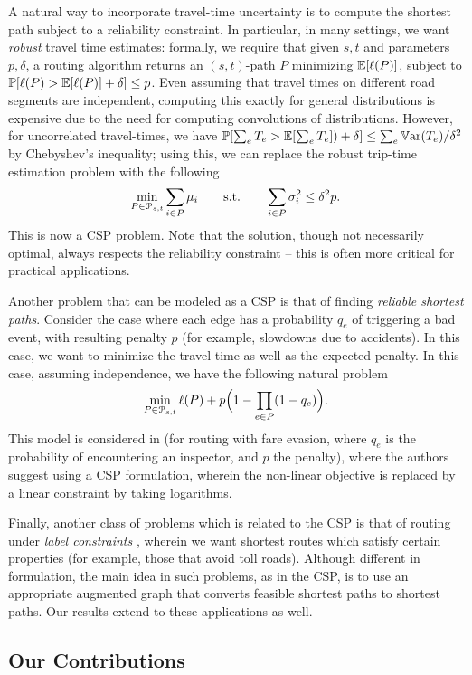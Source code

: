 A natural way to incorporate travel-time uncertainty is to compute the shortest path subject to a reliability constraint.
In particular, in many settings, we want \emph{robust} travel time estimates: formally, we require that given $s,t$ and parameters $p,\delta$, a routing algorithm returns an $(s,t)$-path $P$ minimizing $\mathbb{E}[\ell(P)]$, subject to $\mathbb{P}[\ell(P)>\mathbb{E}[\ell(P)]+\delta]\leq p$.
Even assuming that travel times on different road segments are independent, computing this exactly for general distributions is expensive due to the need for computing convolutions of distributions. However, for uncorrelated travel-times, we have $\mathbb{P}[\sum_eT_e>\mathbb{E}[\sum_eT_e])+\delta]\leq \sum_e\mathbb{V}\textnormal{ar}(T_e)/\delta^2$ by Chebyshev's inequality; using this, we can replace the robust trip-time estimation problem with the following
\[
\min_{ P\in\mathcal{P}_{s,t}}\sum_{i\in P}\mu_i \qquad \text{s.t.}\qquad \sum_{i\in P}\sigma^2_i\leq \delta^2p.
\]
This is now a CSP problem. Note that the solution, though not necessarily optimal, always respects the reliability constraint -- this is often more critical for practical applications.


Another problem that can be modeled as a CSP is that of finding \emph{reliable shortest paths}.
Consider the case where each edge has a probability $q_e$ of triggering a bad event, with resulting penalty $p$ (for example, slowdowns due to accidents).
In this case, we want to minimize the travel time as well as the expected penalty.
In this case, assuming independence, we have the following natural problem
\[
\min_{P\in\mathcal{P}_{s,t}} \ell(P)+p\Bigl(1-\prod_{e\in P}(1-q_e)\Bigr).
\]
This model is considered in \citet{fareevasion} (for routing with fare evasion, where $q_e$ is the probability of encountering an inspector, and $p$ the penalty), where the authors suggest using a CSP formulation, wherein the non-linear objective is replaced by a linear constraint by taking logarithms.

Finally, another class of problems which is related to the CSP is that of routing under \emph{label constraints} \cite{language_csp,rice_csp}, wherein we want shortest routes which satisfy certain properties (for example, those that avoid toll roads). Although different in formulation, the main idea in such problems, as in the CSP, is to use an appropriate augmented graph that converts feasible shortest paths to shortest paths. Our results extend to these applications as well.

\subsection{Our Contributions}

